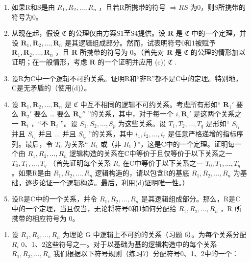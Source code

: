 \begin{enumerate}
\def\labelenumi{(\alph{enumi})}
\setcounter{enumi}{2}
\item
  如果R和S是由 \(R_{1}, R_{2}, \ldots, R_{n}\) ，且若R所携带的符号 \(\Longrightarrow RS\) 为0，则S所携带的符号为0。
\item
  从现在起，假设 \(\mathfrak{C}\) 的公理仅由方案S1至S4提供。设 \(\pmb{R}\) 是 \(\mathfrak{C}\) 中的一个定理，并设 \(\pmb{R}_1, \pmb{R}_2, \ldots, \pmb{R}_n\) 是其逻辑组成部分。然而，试表明符号0和1被赋予 \(\pmb{R}_1, \pmb{R}_2, \ldots, \pmb{R}_n\) ，且 \(\pmb{R}\) 所携带的符号为 0。（首先对 \(\pmb{R}\) 是 \(\mathfrak{C}\) 的公理的情形加以证明；在一般情形，考虑 \(\pmb{R}\) 的一个证明并应用 (c)) \(\mathfrak{C}\) .
\item
  设R为C中一个逻辑不可约关系。证明R和“非R”都不是C中的定理。特别地，C是无矛盾的（使用(d)）。
\item
  设 \(\mathbf{R}_1, \mathbf{R}_2, \ldots, \mathbf{R}_n\) 是 \(\mathfrak{C}\) 中互不相同的逻辑不可约关系。考虑所有形如“ \(\mathbf{R}_1'\) 要么 \(\mathbf{R}_2'\) 要么 \ldots{} 要么 \(\mathbf{R}_n''\) ”的关系，其中，对于每一个 \(i, \mathbf{R}_i'\) 是这两个关系之一 \(\mathbf{R}_i\) ，``不 \(\mathbf{R}_i\) ''。设 \(S_1, S_2, \ldots, S_p\) 为这些关系。设 \(T_1, T_2, \ldots, T_q\) 是形如“ \(S_{i_{1}}\) 并且 \(S_{i_{2}}\) 并且 \(\ldots\) 并且 \(S_{i_{r}}\) ”的关系，其中 \(i_{1}, i_{2}, \ldots, i_{r}\) 是任意严格递增的指标序列。最后，令 \(T_{0}\) 为关系“ \(R_{1}\) 或（非 \(R_{1}\) ）''，这是C中的一个定理。证明每一个由 \(R_{1}, R_{2}, \ldots, R_{n}\) 逻辑构造的关系在C中等价于且仅等价于以下关系之一 \(T_{0}, T_{1}, \ldots, T_{q}\) （首先证明每个关系 \(R_{i}\) 在C中等价于以下关系之一 \(T_{0}, T_{1}, \ldots, T_{q}\) 。如果R是由 \(R_{1}, R_{2}, \ldots, R_{n}\) 逻辑构造的，请以包含R的基底 \(R_{1}, R_{2}, \ldots, R_{n}\) 为基础，逐步论证一个逻辑构造。最后，利用(d)证明唯一性。）
\item
  设R是C中的一个关系，并令 \(R_{1}, R_{2}, \ldots, R_{n}\) 是其逻辑组成部分。那么，R是C中的一个定理，当且仅当，无论将符号0和1如何分配给 \(R_{1}, R_{2}, \ldots, R_{n}\) ，R 所携带的相应符号为 0。
\end{enumerate}

\begin{enumerate}
\def\labelenumi{\arabic{enumi}.}
\setcounter{enumi}{7}
\tightlist
\item
  设 \(R_{1}, R_{2}, \ldots, R_{n}\) 为理论 G 中逻辑上不可约的关系（习题 6）。为每个关系分配 \(R_{i}\) 0、1、2这些符号之一。对于以基础为基的逻辑构造中的每个关系 \(R_{1}, R_{2}, \ldots, R_{n}\) 我们根据以下符号规则（练习7）分配符号0、1、2中的一个：
\end{enumerate}

